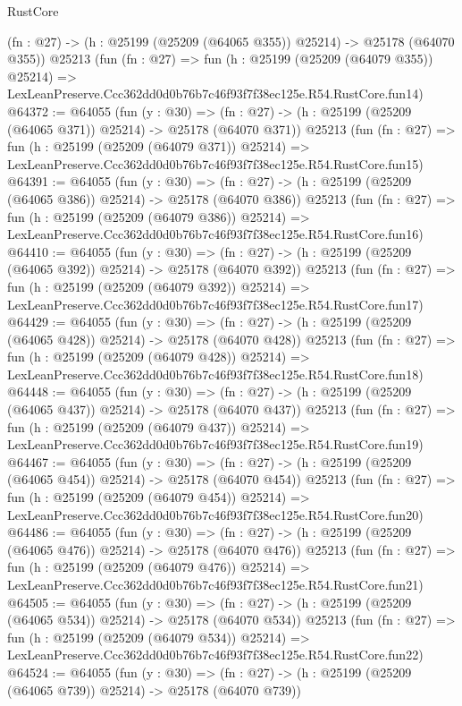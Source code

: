 \begin{lexlean}{RustCore}
\begin{coremodule}
    (fn : @27) -> (h : @25199 (@25209 (@64065 @355)) @25214) -> @25178 (@64070 @355))
    @25213
    (fun (fn : @27) =>
    fun (h : @25199 (@25209 (@64079 @355)) @25214) =>
    LexLeanPreserve.Ccc362dd0d0b76b7c46f93f7f38ec125e.R54.RustCore.fun14)
@64372 := @64055
    (fun (y : @30) =>
    (fn : @27) -> (h : @25199 (@25209 (@64065 @371)) @25214) -> @25178 (@64070 @371))
    @25213
    (fun (fn : @27) =>
    fun (h : @25199 (@25209 (@64079 @371)) @25214) =>
    LexLeanPreserve.Ccc362dd0d0b76b7c46f93f7f38ec125e.R54.RustCore.fun15)
@64391 := @64055
    (fun (y : @30) =>
    (fn : @27) -> (h : @25199 (@25209 (@64065 @386)) @25214) -> @25178 (@64070 @386))
    @25213
    (fun (fn : @27) =>
    fun (h : @25199 (@25209 (@64079 @386)) @25214) =>
    LexLeanPreserve.Ccc362dd0d0b76b7c46f93f7f38ec125e.R54.RustCore.fun16)
@64410 := @64055
    (fun (y : @30) =>
    (fn : @27) -> (h : @25199 (@25209 (@64065 @392)) @25214) -> @25178 (@64070 @392))
    @25213
    (fun (fn : @27) =>
    fun (h : @25199 (@25209 (@64079 @392)) @25214) =>
    LexLeanPreserve.Ccc362dd0d0b76b7c46f93f7f38ec125e.R54.RustCore.fun17)
@64429 := @64055
    (fun (y : @30) =>
    (fn : @27) -> (h : @25199 (@25209 (@64065 @428)) @25214) -> @25178 (@64070 @428))
    @25213
    (fun (fn : @27) =>
    fun (h : @25199 (@25209 (@64079 @428)) @25214) =>
    LexLeanPreserve.Ccc362dd0d0b76b7c46f93f7f38ec125e.R54.RustCore.fun18)
@64448 := @64055
    (fun (y : @30) =>
    (fn : @27) -> (h : @25199 (@25209 (@64065 @437)) @25214) -> @25178 (@64070 @437))
    @25213
    (fun (fn : @27) =>
    fun (h : @25199 (@25209 (@64079 @437)) @25214) =>
    LexLeanPreserve.Ccc362dd0d0b76b7c46f93f7f38ec125e.R54.RustCore.fun19)
@64467 := @64055
    (fun (y : @30) =>
    (fn : @27) -> (h : @25199 (@25209 (@64065 @454)) @25214) -> @25178 (@64070 @454))
    @25213
    (fun (fn : @27) =>
    fun (h : @25199 (@25209 (@64079 @454)) @25214) =>
    LexLeanPreserve.Ccc362dd0d0b76b7c46f93f7f38ec125e.R54.RustCore.fun20)
@64486 := @64055
    (fun (y : @30) =>
    (fn : @27) -> (h : @25199 (@25209 (@64065 @476)) @25214) -> @25178 (@64070 @476))
    @25213
    (fun (fn : @27) =>
    fun (h : @25199 (@25209 (@64079 @476)) @25214) =>
    LexLeanPreserve.Ccc362dd0d0b76b7c46f93f7f38ec125e.R54.RustCore.fun21)
@64505 := @64055
    (fun (y : @30) =>
    (fn : @27) -> (h : @25199 (@25209 (@64065 @534)) @25214) -> @25178 (@64070 @534))
    @25213
    (fun (fn : @27) =>
    fun (h : @25199 (@25209 (@64079 @534)) @25214) =>
    LexLeanPreserve.Ccc362dd0d0b76b7c46f93f7f38ec125e.R54.RustCore.fun22)
@64524 := @64055
    (fun (y : @30) =>
    (fn : @27) -> (h : @25199 (@25209 (@64065 @739)) @25214) -> @25178 (@64070 @739))

\end{coremodule}
\end{lexlean}
